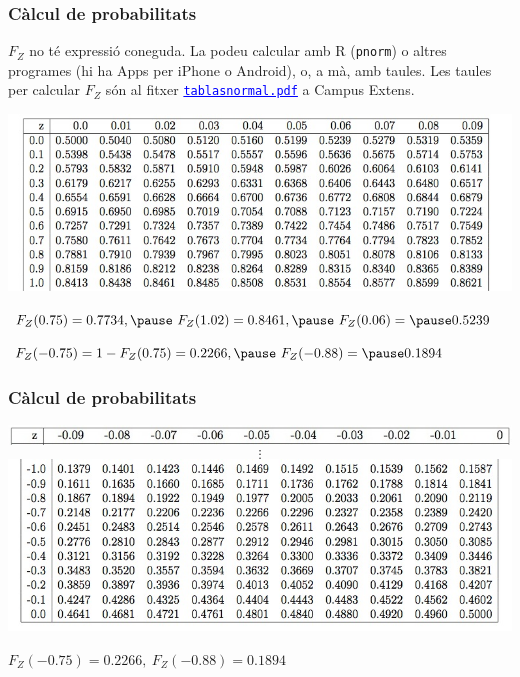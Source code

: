 \documentclass[12pt,t]{beamer}\usepackage[]{graphicx}\usepackage[]{color}
\newcommand{\blue}[1]{\textcolor{blue}{#1}}
\theoremstyle{plain}
\theoremstyle{definition}
\begin{document}
\begin{frame}
\frametitle{Càlcul de probabilitats}
\vspace*{-2ex}

$F_Z$ no té expressió coneguda. La podeu calcular amb R (\texttt{pnorm}) o altres programes (hi ha Apps per iPhone o Android), o, a mà, amb taules.
Les taules per calcular $F_Z$ són al fitxer \blue{\underline{\texttt{tablasnormal.pdf}}} a Campus Extens.
\vspace*{-2ex}

\begin{center}
\hspace*{-0.4cm}\includegraphics[width=1.1\linewidth]{tabla.jpg}
\end{center}
\pause

{\small $F_Z(0.75)=0.7734,\pause\ F_Z(1.02)=0.8461,\pause\ F_Z(0.06)=\pause 0.5239$\\[1ex]
\pause

$F_Z(-0.75)=1-F_Z(0.75)=0.2266,\pause\ F_Z(-0.88)=\pause 0.1894$

}
\end{frame}


\begin{frame}
\frametitle{Càlcul de probabilitats}
\vspace*{-1cm}

\begin{center}
\hspace*{-0.2cm}\includegraphics[width=1.06\linewidth]{taula4.jpg}
$$
\vdots
$$
\hspace*{-0.4cm}\includegraphics[width=1.1\linewidth]{tabla2.jpg}
\end{center}

{\small 
$F_Z(-0.75)= 0.2266,\ F_Z(-0.88)= 0.1894$

}
\end{frame}
\end{document}
